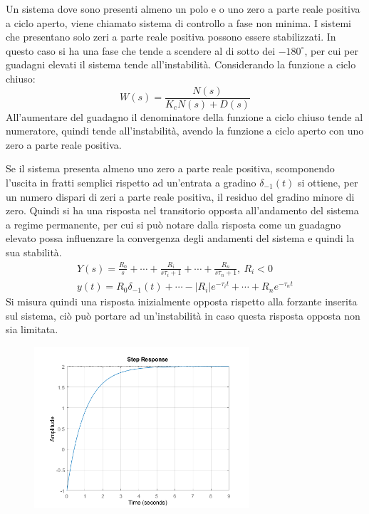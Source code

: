 \documentclass{article}
\numberwithin{equation}{subsection}
\begin{document}
Un sistema dove sono presenti almeno un polo e o uno zero a parte reale positiva a ciclo aperto, viene chiamato sistema di controllo a fase non minima. I sistemi che presentano 
solo zeri a parte reale positiva possono essere stabilizzati. In questo caso si ha una fase che tende a scendere al di sotto dei $-180^{\circ}$, per cui per guadagni elevati 
il sistema tende all'instabilità. Considerando la funzione a ciclo chiuso:
\begin{equation*}
    W(s)=\displaystyle\frac{N(s)}{K_cN(s)+D(s)}
\end{equation*}
All'aumentare del guadagno il denominatore 
della funzione a ciclo chiuso tende al numeratore, quindi tende all'instabilità, avendo la funzione a ciclo aperto con uno zero a parte reale positiva. 


Se il sistema presenta almeno uno zero a parte reale positiva, scomponendo l'uscita in fratti semplici rispetto ad un'entrata a gradino $\delta_{-1}(t)$ si ottiene, per un 
numero dispari di zeri a parte reale positiva, il residuo del gradino minore di zero. Quindi si ha una risposta nel transitorio opposta all'andamento del sistema a regime 
permanente, per cui si può notare dalla risposta come un guadagno elevato possa influenzare la convergenza degli andamenti del sistema e quindi la sua stabilità. 
\begin{gather*}
    Y(s)=\displaystyle\frac{R_0}{s}+\cdots+\frac{R_i}{s\tau_i+1}+\cdots+\frac{R_n}{s\tau_n+1},\:R_i<0\\
    y(t)=R_0\delta_{-1}(t)+\cdots-|R_i|e^{-\tau_it}+\cdots+R_ne^{-\tau_nt}
\end{gather*}
Si misura quindi una risposta inizialmente opposta rispetto alla forzante inserita sul sistema, ciò può portare ad un'instabilità in caso questa risposta opposta non sia 
limitata. 
\begin{figure}[H]%
    \centering
    \includegraphics[width=8cm]{Step1.png}%
\end{figure}
\end{document}
